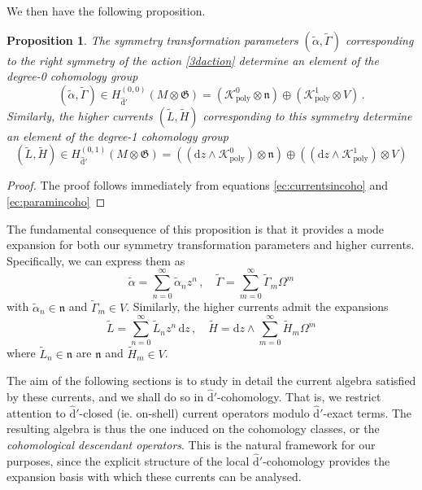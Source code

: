 \documentclass[11pt]{amsart}
\newcommand{\dr}{{\mathrm{d}}}
\newcommand{\fn}{\mathfrak{n}}
\newcommand{\fG}{\mathfrak{G}}
\numberwithin{equation}{section}
\numberwithin{figure}{section}
\numberwithin{table}{section}
\renewcommand{\d}{\mathrm{d}}
\theoremstyle{thm}
\newtheorem{prop}[theorem]{Proposition}
\numberwithin{equation}{subsection}
\theoremstyle{definition}
\theoremstyle{rem}
\begin{document}
We then have the following proposition.






\begin{prop}\label{raviolopoly}
The symmetry transformation parameters $(\tilde \alpha,\tilde \Gamma)$ corresponding to the right symmetry of the action \eqref{3daction} determine an element of the degree-0 cohomology group
\begin{equation}
    (\tilde \alpha,\tilde \Gamma) \in H^{(0,0)}_{\hat \dr'}(M\otimes \mathfrak{G}) = (\mathcal{K}_{\mathrm{poly}}^0 \otimes \fn ) \oplus (\mathcal{K}^1_{\mathrm{poly}} \otimes V) \,.
\end{equation}
Similarly, the higher currents $(\tilde L,\tilde H)$ corresponding to this symmetry determine an element of the degree-1 cohomology group 
\begin{equation}
    (\tilde L,\tilde H)\in H_{\hat \dr'}^{(0,1)}(M\otimes \fG)=((\dr z \wedge \mathcal{K}_{\mathrm{poly}}^0) \otimes \fn)\oplus  ((\dr z\wedge\mathcal{K}_{\mathrm{poly}}^1 ) \otimes V)
\end{equation}


 \end{prop}

 \begin{proof}
     The proof follows immediately from equations \eqref{ec:currentsincoho} and \eqref{ec:paramincoho} 
\end{proof}


The fundamental consequence of this proposition is that it provides a mode expansion for both our symmetry transformation parameters and higher currents. Specifically, we can express them as
\begin{equation}
\label{ec:paramodes}
    \tilde{\alpha} = \sum_{n=0}^\infty \tilde{\alpha}_n z^n \,,\quad \tilde{\Gamma} = \sum_{m=0}^\infty \tilde{\Gamma}_m \Omega^m
\end{equation}
with $\tilde{\alpha}_n \in \mathfrak{n}$ and $\tilde{\Gamma}_m \in V$. Similarly, the higher currents admit the expansions
\begin{equation}
\label{ec:curmodes}
    \tilde{L} = \sum_{n=0}^\infty \tilde{L}_n z^n \,\dr z\,,\quad \tilde{H} = \dr z \wedge\sum_{m=0}^\infty \tilde{H}_m  \Omega^m
\end{equation}
where $\tilde{L}_n \in  \fn$ are $\mathfrak{n}$ and $\tilde{H}_m \in V$. 


The aim of the following sections is to study in detail the current algebra satisfied by these currents, and we shall do so in $\hat{\d}'$-cohomology. That is, we restrict attention to $\hat{\d}'$-closed (ie. on-shell) current operators modulo $\hat{\d}'$-exact terms. The resulting algebra is thus the one induced on the cohomology classes, or the \textit{cohomological descendant operators}. This is the natural framework for our purposes, since the explicit structure of the local $\hat{\d}'$-cohomology provides the expansion basis with which these currents can be analysed.
\end{document}
